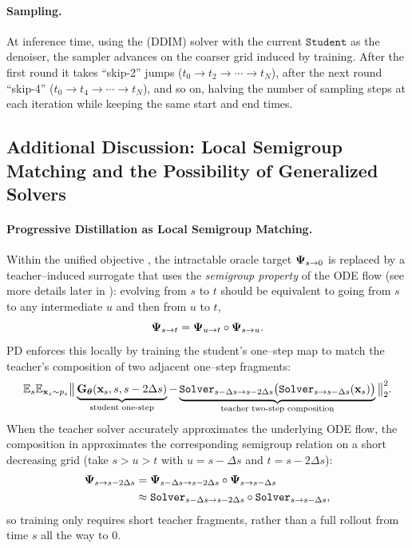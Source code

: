 \paragraph{Sampling.}
At inference time, using the (DDIM) solver with the current $\mathtt{Student}$ as the denoiser, the sampler advances on the coarser grid induced by training. After the first round it takes ``skip-2'' jumps ($t_0 \to t_2 \to \cdots \to t_N$), after the next round ``skip-4'' ($t_0 \to t_4 \to \cdots \to t_N$), and so on, halving the number of sampling steps at each iteration while keeping the same start and end times.

\subsection{Additional Discussion: Local Semigroup Matching and the Possibility of Generalized Solvers}


\paragraph{Progressive Distillation as Local Semigroup Matching.}
Within the unified objective , the intractable oracle
target ${\bm{\Psi}}_{s\to 0}$ is replaced by a teacher–induced surrogate that uses the
\emph{semigroup property} of the ODE flow (see more details later in ): evolving from $s$ to $t$ should be
equivalent to going from $s$ to any intermediate $u$ and then from $u$ to $t$,
\[
{\bm{\Psi}}_{s\to t} = {\bm{\Psi}}_{u\to t}\circ{\bm{\Psi}}_{s\to u}.
\]
PD enforces this locally by training the student’s one–step map to match the
teacher’s composition of two adjacent one–step fragments:
\begin{align}\label{eq:pd-local}
  \mathbb{E}_{s}\mathbb{E}_{{\mathbf{x}}_s\sim p_s}
  \big\|
    \underbrace{{\mathbf{G}}_{{\bm{\theta}}}({\mathbf{x}}_s, s, s-2\Delta s)}_{\text{student one-step}}
    -
    \underbrace{\mathtt{Solver}_{s-\Delta s\to s-2\Delta s}\big(\mathtt{Solver}_{s\to s-\Delta s}({\mathbf{x}}_s)\big)}_{\text{teacher two-step composition}}
  \big\|_2^2.
\end{align}
When the teacher solver accurately approximates the underlying ODE flow,
the composition in  approximates the corresponding semigroup
relation on a short decreasing grid (take $s>u>t$ with $u=s-\Delta s$ and $t=s-2\Delta s$):
\begin{align*}
  {\bm{\Psi}}_{s\to s-2\Delta s}
  &= {\bm{\Psi}}_{s-\Delta s\to s-2\Delta s}\circ{\bm{\Psi}}_{s\to s-\Delta s}
  \\&\approx
  \mathtt{Solver}_{s-\Delta s\to s-2\Delta s}\circ \mathtt{Solver}_{s\to s-\Delta s},
\end{align*}
so training only requires short teacher fragments, rather than a full rollout
from time $s$ all the way to $0$.

